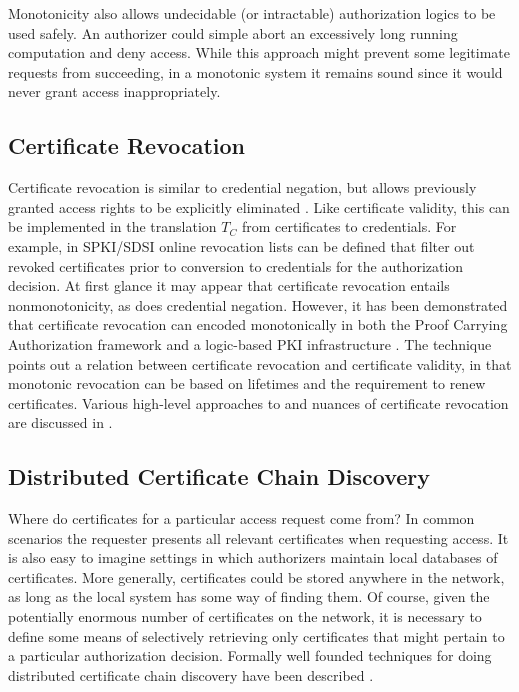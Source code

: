 Monotonicity also allows undecidable (or intractable) authorization logics to be used safely. An
authorizer could simple abort an excessively long running computation and deny access. While
this approach might prevent some legitimate requests from succeeding, in a monotonic system it
remains sound since it would never grant access inappropriately.

\subsection{Certificate Revocation}

Certificate revocation is similar to credential negation, but allows previously granted access
rights to be explicitly eliminated \cite{Rivest:CWECRL}. Like certificate validity, this can be
implemented in the translation $T_C$ from certificates to credentials. For example, in SPKI/SDSI
\cite{RFC-2693} online revocation lists can be defined that filter out revoked certificates
prior to conversion to credentials for the authorization decision. At first glance it may appear
that certificate revocation entails nonmonotonicity, as does credential negation. However, it
has been demonstrated that certificate revocation can encoded monotonically in both the Proof
Carrying Authorization framework \cite{Bauer:GFACSW} and a logic-based PKI infrastructure
\cite{lbi-fc01}. The technique points out a relation between certificate revocation and
certificate validity, in that monotonic revocation can be based on lifetimes and the requirement
to renew certificates. Various high-level approaches to and nuances of certificate revocation
are discussed in \cite{Rivest:CWECRL}.

\subsection{Distributed Certificate Chain Discovery}

Where do certificates for a particular access request come from? In common scenarios the
requester presents all relevant certificates when requesting access. It is also easy to imagine
settings in which authorizers maintain local databases of certificates. More generally,
certificates could be stored anywhere in the network, as long as the local system has some way
of finding them. Of course, given the potentially enormous number of certificates on the
network, it is necessary to define some means of selectively retrieving only certificates that
might pertain to a particular authorization decision. Formally well founded techniques for doing
distributed certificate chain discovery have been described \cite{Li:DCDTM,Gunter:PDCR}.

